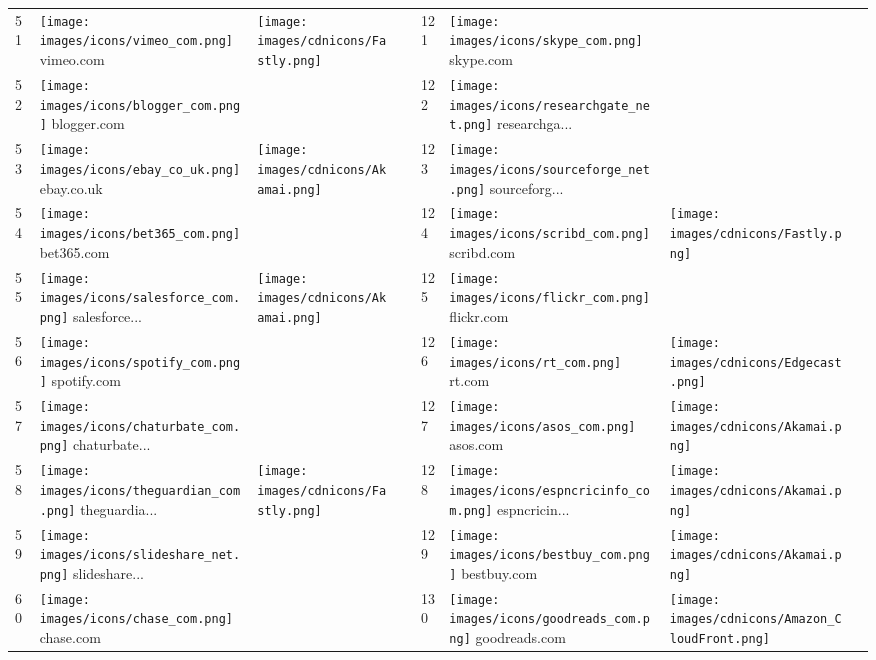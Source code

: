\begin{table}[tbp]
\begin{tabular}{|llll|llll|}
51 & \texttt{[image: images/icons/vimeo\_com.png]} vimeo.com & \texttt{[image: images/cdnicons/Fastly.png]} & & 121 & \texttt{[image: images/icons/skype\_com.png]} skype.com & & \\
52 & \texttt{[image: images/icons/blogger\_com.png]} blogger.com & & & 122 & \texttt{[image: images/icons/researchgate\_net.png]} researchga... & & \\
53 & \texttt{[image: images/icons/ebay\_co\_uk.png]} ebay.co.uk & \texttt{[image: images/cdnicons/Akamai.png]} & & 123 & \texttt{[image: images/icons/sourceforge\_net.png]} sourceforg... & & \\
54 & \texttt{[image: images/icons/bet365\_com.png]} bet365.com & & & 124 & \texttt{[image: images/icons/scribd\_com.png]} scribd.com & \texttt{[image: images/cdnicons/Fastly.png]} & \\
55 & \texttt{[image: images/icons/salesforce\_com.png]} salesforce... & \texttt{[image: images/cdnicons/Akamai.png]} & & 125 & \texttt{[image: images/icons/flickr\_com.png]} flickr.com & & \\
56 & \texttt{[image: images/icons/spotify\_com.png]} spotify.com & & & 126 & \texttt{[image: images/icons/rt\_com.png]} rt.com & \texttt{[image: images/cdnicons/Edgecast.png]} & \\
57 & \texttt{[image: images/icons/chaturbate\_com.png]} chaturbate... & & & 127 & \texttt{[image: images/icons/asos\_com.png]} asos.com & \texttt{[image: images/cdnicons/Akamai.png]} & \\
58 & \texttt{[image: images/icons/theguardian\_com.png]} theguardia... & \texttt{[image: images/cdnicons/Fastly.png]} & & 128 & \texttt{[image: images/icons/espncricinfo\_com.png]} espncricin... & \texttt{[image: images/cdnicons/Akamai.png]} & \\
59 & \texttt{[image: images/icons/slideshare\_net.png]} slideshare... & & & 129 & \texttt{[image: images/icons/bestbuy\_com.png]} bestbuy.com & \texttt{[image: images/cdnicons/Akamai.png]} & \\
60 & \texttt{[image: images/icons/chase\_com.png]} chase.com & & & 130 & \texttt{[image: images/icons/goodreads\_com.png]} goodreads.com & \texttt{[image: images/cdnicons/Amazon\_CloudFront.png]} & \\

\end{tabular}
\end{table}
